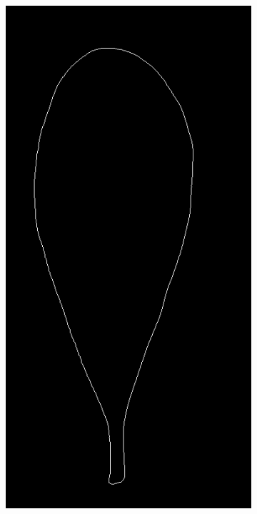 \begin{frame}
\begin{figure}[ht!]
\begin{subfigure}[b]{0.19\textwidth}
		\end{subfigure}
		\begin{subfigure}[b]{0.19\textwidth}
			\centering
			\includegraphics[width=\textwidth]{img/contour.jpg}

\end{subfigure}
\end{figure}
\end{frame}
